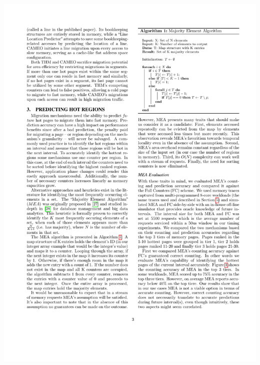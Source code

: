 

\setlength{\textfloatsep}{5pt}
\begin{algorithm}[t]
\centering
% 
% 
 \includegraphics[scale=0.8]{figures/mea_algorithm.pdf}
 \label{alg:mea}
\end{algorithm}

